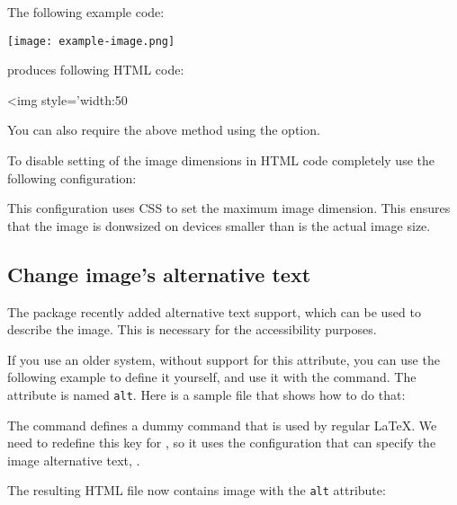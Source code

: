 The following example code:

\begin{texsource}
\texttt{[image: example-image.png]}
\end{texsource}

produces following HTML code:

\begin{htmlsource}
<img style='width:50%
\end{htmlsource}

You can also require the above method using the 
option.

To disable setting of the image dimensions in HTML code completely
use the following configuration:

\begin{texsource}

\EndPreamble
\end{texsource}

This configuration uses CSS to set the maximum image dimension. This ensures that
the image is donwsized on devices smaller than is the actual image size.


\subsection{Change image's alternative text}

The  package recently added alternative text support,
which can be used to describe the image. This is necessary
for the accessibility purposes.

If you use an older system, without support for this attribute, 
you can use the following example to define it yourself, and use it 
with the  command. The attribute is named 
\texttt{alt}. Here is a sample file that shows how to do that:


The  command defines a dummy command that
is used by regular \LaTeX. We need to redefine this key for \texfourht, so it uses the
configuration that can specify the image alternative text, .


The resulting HTML file now contains image with the \texttt{alt} attribute:


